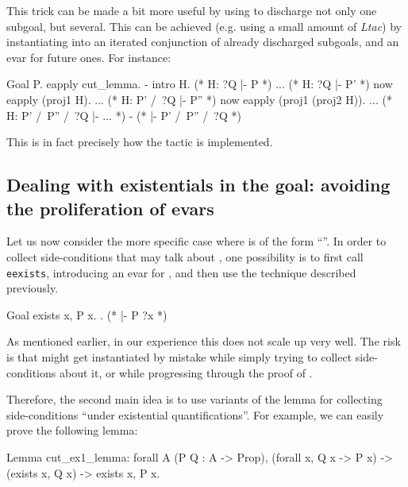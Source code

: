 \documentclass[xetex,format=acmlarge,screen=true,authorversion=true]{acmart-modified}
\begin{document}
\vspace{0.8em}

This trick can be made a bit more useful by using  to discharge not only
one subgoal, but several. This can be achieved (e.g. using a small amount of
\emph{Ltac}) by instantiating  into an iterated conjunction of already
discharged subgoals, and an evar for future ones. For instance:

\begin{coq}
  Goal P.
    eapply cut_lemma.
    - intro H. (* H: ?Q |- P *) ...
      (* H: ?Q |- P' *) now eapply (proj1 H). ...
      (* H: P' /\ ?Q |- P'' *) now eapply (proj1 (proj2 H)). ...
      (* H: P' /\ P'' /\ ?Q |- ... *)
    - (* |- P' /\ P'' /\ ?Q *)
\end{coq}

\vspace{0.3em}

This is in fact precisely how the  tactic is implemented.

\subsection{Dealing with existentials in the goal: avoiding the proliferation of evars}

Let us now consider the more specific case where  is of the form
``''. In order to collect side-conditions that may talk about
, one possibility is to first call \texttt{eexists}, introducing an evar
for , and then use the technique described previously.

\begin{coq}
  Goal exists x, P x.
    \eexists. (* |- P ?x *)
\end{coq}

As mentioned earlier, in our experience this does not scale up very well. The
risk is that might  get instantiated by mistake while simply trying to
collect side-conditions about it, or while progressing through the proof of
.

Therefore, the second main idea is to use variants of the  lemma for
collecting side-conditions ``under existential quantifications''. For example,
we can easily prove the following lemma:

\begin{coq}
  Lemma cut_ex1_lemma: forall A (P Q : A -> Prop),
    (forall x, Q x -> P x) ->
    (exists x, Q x) ->
    exists x, P x.
\end{coq}
\end{document}
